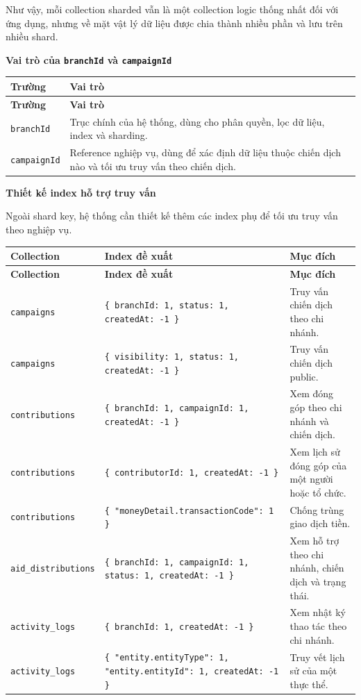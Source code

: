 \documentclass[12pt,a4paper]{article}
\begin{document}
Như vậy, mỗi collection sharded vẫn là một collection logic thống nhất đối với ứng dụng, nhưng về mặt vật lý dữ liệu được chia thành nhiều phần và lưu trên nhiều shard.

\textbf{Vai trò của \texttt{branchId} và \texttt{campaignId}}

\begin{center}
\small
\begin{longtable}{|p{3.3cm}|p{9.2cm}|}
\hline
\textbf{Trường} & \textbf{Vai trò} \\ \hline
\endfirsthead
\hline
\textbf{Trường} & \textbf{Vai trò} \\ \hline
\endhead
\texttt{branchId} & Trục chính của hệ thống, dùng cho phân quyền, lọc dữ liệu, index và sharding. \\ \hline
\texttt{campaignId} & Reference nghiệp vụ, dùng để xác định dữ liệu thuộc chiến dịch nào và tối ưu truy vấn theo chiến dịch. \\ \hline
\end{longtable}
\normalsize
\end{center}

\textbf{Thiết kế index hỗ trợ truy vấn}

Ngoài shard key, hệ thống cần thiết kế thêm các index phụ để tối ưu truy vấn theo nghiệp vụ.

\begin{center}
\scriptsize
\begin{longtable}{|p{3cm}|p{5cm}|p{4.6cm}|}
\hline
\textbf{Collection} & \textbf{Index đề xuất} & \textbf{Mục đích} \\ \hline
\endfirsthead
\hline
\textbf{Collection} & \textbf{Index đề xuất} & \textbf{Mục đích} \\ \hline
\endhead
\texttt{campaigns} & \texttt{\{ branchId: 1, status: 1, createdAt: -1 \}} & Truy vấn chiến dịch theo chi nhánh. \\ \hline
\texttt{campaigns} & \texttt{\{ visibility: 1, status: 1, createdAt: -1 \}} & Truy vấn chiến dịch public. \\ \hline
\texttt{contributions} & \texttt{\{ branchId: 1, campaignId: 1, createdAt: -1 \}} & Xem đóng góp theo chi nhánh và chiến dịch. \\ \hline
\texttt{contributions} & \texttt{\{ contributorId: 1, createdAt: -1 \}} & Xem lịch sử đóng góp của một người hoặc tổ chức. \\ \hline
\texttt{contributions} & \texttt{\{ "moneyDetail.transactionCode": 1 \}} & Chống trùng giao dịch tiền. \\ \hline
\texttt{aid\_distributions} & \texttt{\{ branchId: 1, campaignId: 1, status: 1, createdAt: -1 \}} & Xem hỗ trợ theo chi nhánh, chiến dịch và trạng thái. \\ \hline
\texttt{activity\_logs} & \texttt{\{ branchId: 1, createdAt: -1 \}} & Xem nhật ký thao tác theo chi nhánh. \\ \hline
\texttt{activity\_logs} & \texttt{\{ "entity.entityType": 1, "entity.entityId": 1, createdAt: -1 \}} & Truy vết lịch sử của một thực thể. \\ \hline
\end{longtable}
\normalsize
\end{center}
\end{document}
